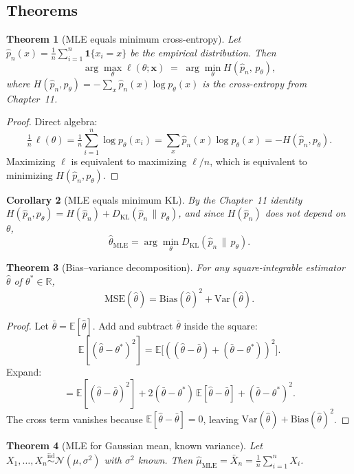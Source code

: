 \documentclass[11pt]{article}
\newtheorem{theorem}{Theorem}[section]
\newtheorem{corollary}[theorem]{Corollary}
\theoremstyle{remark}
\begin{document}
\subsection*{Theorems}

\begin{theorem}[MLE equals minimum cross-entropy]\label{thm:mle-ce}
Let $\hat p_n(x) = \tfrac{1}{n}\sum_{i=1}^n \mathbf{1}\{x_i = x\}$ be the empirical distribution. Then
\[
\arg\max_\theta \ell(\theta;\mathbf{x}) \;=\; \arg\min_\theta H(\hat p_n,\,p_\theta),
\]
where $H(\hat p_n, p_\theta) = -\sum_x \hat p_n(x)\log p_\theta(x)$ is the cross-entropy from Chapter~11.
\end{theorem}

\begin{proof}
Direct algebra:
\[
\tfrac{1}{n}\,\ell(\theta) = \tfrac{1}{n}\sum_{i=1}^n \log p_\theta(x_i) = \sum_x \hat p_n(x)\log p_\theta(x) = -H(\hat p_n, p_\theta).
\]
Maximizing $\ell$ is equivalent to maximizing $\ell/n$, which is equivalent to minimizing $H(\hat p_n,p_\theta)$.
\end{proof}

\begin{corollary}[MLE equals minimum KL]
By the Chapter~11 identity $H(\hat p_n,p_\theta) = H(\hat p_n) + D_{\mathrm{KL}}(\hat p_n \,\|\, p_\theta)$, and since $H(\hat p_n)$ does not depend on $\theta$,
\[
\hat\theta_{\mathrm{MLE}} = \arg\min_\theta D_{\mathrm{KL}}(\hat p_n \,\|\, p_\theta).
\]
\end{corollary}

\begin{theorem}[Bias--variance decomposition]\label{thm:bv}
For any square-integrable estimator $\hat\theta$ of $\theta^* \in \mathbb{R}$,
\[
\mathrm{MSE}(\hat\theta) = \mathrm{Bias}(\hat\theta)^2 + \mathrm{Var}(\hat\theta).
\]
\end{theorem}

\begin{proof}
Let $\bar\theta = \mathbb{E}[\hat\theta]$. Add and subtract $\bar\theta$ inside the square:
\[
\mathbb{E}[(\hat\theta-\theta^*)^2] = \mathbb{E}\bigl[((\hat\theta-\bar\theta)+(\bar\theta-\theta^*))^2\bigr].
\]
Expand:
\[
= \mathbb{E}[(\hat\theta-\bar\theta)^2] + 2(\bar\theta-\theta^*)\,\mathbb{E}[\hat\theta-\bar\theta] + (\bar\theta-\theta^*)^2.
\]
The cross term vanishes because $\mathbb{E}[\hat\theta-\bar\theta]=0$, leaving $\mathrm{Var}(\hat\theta) + \mathrm{Bias}(\hat\theta)^2$.
\end{proof}

\begin{theorem}[MLE for Gaussian mean, known variance]\label{thm:mle-gauss}
Let $X_1,\dots,X_n \stackrel{\mathrm{iid}}{\sim} \mathcal{N}(\mu,\sigma^2)$ with $\sigma^2$ known. Then $\hat\mu_{\mathrm{MLE}} = \bar X_n = \tfrac{1}{n}\sum_{i=1}^n X_i$.
\end{theorem}
\end{document}
